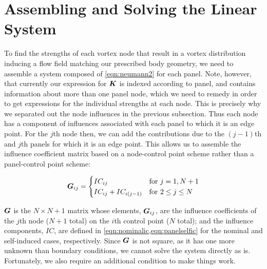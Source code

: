 \section{Assembling and Solving the Linear System}

To find the strengths of each vortex node that result in a vortex distribution inducing a flow field matching our prescribed body geometry, we need to assemble a system composed of \cref{eqn:neumann2} for each panel.
%
Note, however, that currently our expression for \(\bm{K}\) is indexed according to panel, and contains information about more than one panel node, which we need to remedy in order to get expressions for the individual strengths at each node.
%
This is precisely why we separated out the node influences in the previous subsection.
%
Thus each node has a component of influences associated with each panel to which it is an edge point.
%
For the \(j\)th node then, we can add the contributions due to the \((j-1)\)th and \(j\)th panels for which it is an edge point.
%
This allows us to assemble the influence coefficient matrix based on a node-control point scheme rather than a panel-control point scheme:

\begin{equation}
\vect{G}_{ij} =
    \begin{cases}
        IC_{ij}        \hfill & \text{for }j=1,N+1 \\
        IC_{ij} + IC_{i(j-1)} & \text{for }2 \leq j \leq N \\
    \end{cases}
\end{equation}

\where \(\bm{G}\) is the \(N \times N+1\) matrix whose elements, \(\bm{G}_{ij}\), are the influence coefficients of the \(j\)th node (\(N+1\) total) on the \(i\)th control point (\(N\) total); and the influence components, \(IC\), are defined in \cref{eqn:nominalic,eqn:panelselfic} for the nominal and self-induced cases, respectively.
%
Since \(\bm{G}\) is not square, as it has one more unknown than boundary conditions, we cannot solve the system directly as is.
%
Fortunately, we also require an additional condition to make things work.

